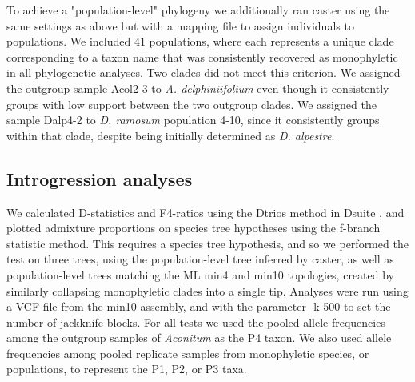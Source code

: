 \documentclass[11pt]{article}
\begin{document}
To achieve a "population-level" phylogeny we additionally ran caster using the same settings as above but with a mapping file to assign individuals to populations. We included 41 populations, where each represents a unique clade corresponding to a taxon name
that was consistently recovered as monophyletic in all phylogenetic analyses. 
Two clades did not meet this criterion.
We assigned the outgroup sample Acol2-3 to \emph{A. delphiniifolium} even though
it consistently groups with low support between the two outgroup clades. 
We assigned the sample Dalp4-2 to \emph{D. ramosum} population 4-10, 
since it consistently groups within that clade, despite being initially 
determined as \emph{D. alpestre}.


\subsection{Introgression analyses}
We calculated D-statistics \citep{durand_testing_2011} and F4-ratios using the
Dtrios method in Dsuite \citep{malinsky_dsuite_2021}, and plotted admixture 
proportions on species tree hypotheses using the f-branch statistic method.
This requires a species tree hypothesis, and so we performed the test 
on three trees, using the population-level tree inferred by caster, as well as population-level trees matching the ML min4 and min10 topologies, created by similarly collapsing monophyletic clades into a single tip.
Analyses were run using a VCF file from the min10 assembly, and with the 
parameter -k 500 to set the number of jackknife blocks.
% 
For all tests we used the pooled allele frequencies among the outgroup samples 
of \emph{Aconitum} as the P4 taxon. We also used allele frequencies among pooled
replicate samples from monophyletic species, or populations, to represent the P1, P2, or P3 taxa. 
% 
\end{document}
